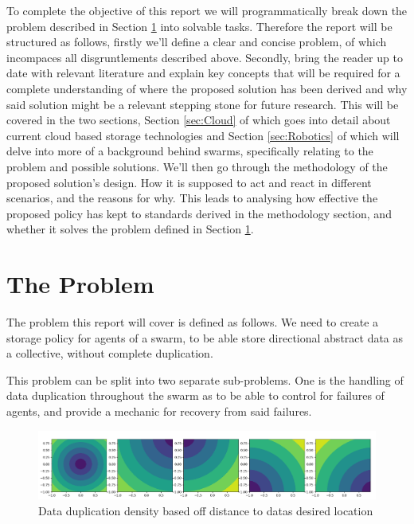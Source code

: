 \documentclass{UoYCSproject}
\begin{document}
To complete the objective of this report we will programmatically break down the problem described in Section \ref{sec:Problem} into solvable tasks. 
Therefore the report will be structured as follows, firstly we’ll define a clear and concise problem, of which incompaces all disgruntlements described above. 
Secondly, bring the reader up to date with relevant literature and explain key concepts that will be required for a complete understanding of where the proposed solution has been derived and why said solution might be a relevant stepping stone for future research. 
This will be covered in the two sections, Section \ref{sec:Cloud} of which goes into detail about current cloud based storage technologies and Section \ref{sec:Robotics} of which will delve into more of a background behind swarms, specifically relating to the problem and possible solutions. 
We’ll then go through the methodology of the proposed solution’s design.
How it is supposed to act and react in different scenarios, and the reasons for why. 
This leads to analysing how effective the proposed policy has kept to standards derived in the methodology section, and whether it solves the problem defined in Section \ref{sec:Problem}.

\section{The Problem}
\label{sec:Problem}

The problem this report will cover is defined as follows. 
We need to create a storage policy for agents of a swarm, to be able store directional abstract data as a collective, without complete duplication.

This problem can be split into two separate sub-problems. 
One is the handling of data duplication throughout the swarm as to be able to control for failures of agents, and provide a mechanic for recovery from said failures. 

\begin{figure}[htb]
\label{fig:popdensity}
\begin{center}
\centering
\includegraphics[width=\linewidth]{"./ExplanationImgs/Memory_Pop_Density.png"}
\caption{Data duplication density based off distance to datas desired location}
\end{center}
\end{figure}
\end{document}

